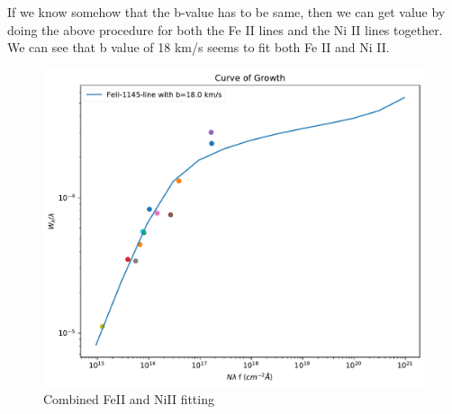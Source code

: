 \documentclass[12pt]{article}
\begin{document}
\newpage

If we know somehow that the b-value has to be same, then we can get value by doing the above procedure for both the Fe II lines and the Ni II lines together. We can see that b value of 18 km/s  seems to fit both Fe II and Ni II.

\begin{figure}[H]
	\centering
	\includegraphics[width=0.9\linewidth]{../FeII-NiII-consist-fiting}
	\caption{Combined FeII and NiII fitting}
	\label{fig:feii-niii-consist-fiting}
\end{figure}

\newpage
\end{document}
